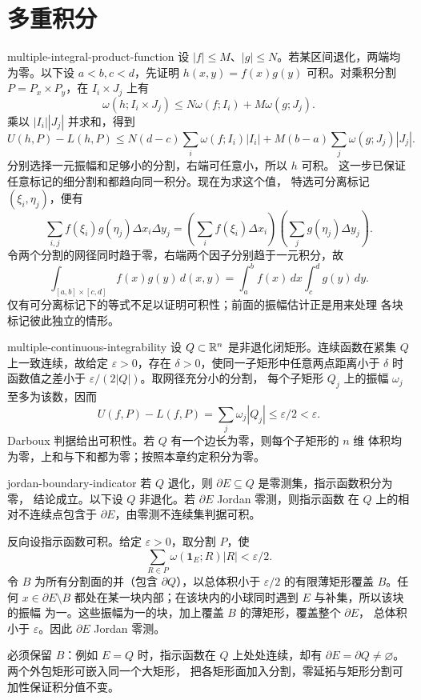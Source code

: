 \chapter{多重积分}
\label{chap:multiple-integrals-solutions}

\begin{solution}{multiple-integral-product-function}
设 $|f|\le M$、$|g|\le N$。若某区间退化，两端均为零。以下设
$a<b,c<d$，先证明 $h(x,y)=f(x)g(y)$ 可积。对乘积分割
$P=P_x\times P_y$，在 $I_i\times J_j$ 上有
\[
 \omega(h;I_i\times J_j)
 \le N\omega(f;I_i)+M\omega(g;J_j).
\]
乘以 $|I_i||J_j|$ 并求和，得到
\[
 U(h,P)-L(h,P)
 \le N(d-c)\sum_i\omega(f;I_i)|I_i|
     +M(b-a)\sum_j\omega(g;J_j)|J_j|.
\]
分别选择一元振幅和足够小的分割，右端可任意小，所以 $h$ 可积。
这一步已保证任意标记的细分割和都趋向同一积分。现在为求这个值，
特选可分离标记 $(\xi_i,\eta_j)$，便有
\[
 \sum_{i,j}f(\xi_i)g(\eta_j)\Delta x_i\Delta y_j
 =\left(\sum_i f(\xi_i)\Delta x_i\right)
  \left(\sum_j g(\eta_j)\Delta y_j\right).
\]
令两个分割的网径同时趋于零，右端两个因子分别趋于一元积分，故
\[
 \int_{[a,b]\times[c,d]}f(x)g(y)\,d(x,y)
 =\int_a^bf(x)\,dx\int_c^dg(y)\,dy.
\]
仅有可分离标记下的等式不足以证明可积性；前面的振幅估计正是用来处理
各块标记彼此独立的情形。
\end{solution}

\begin{solution}{multiple-continuous-integrability}
设 $Q\subset\mathbb{R}^n$ 是非退化闭矩形。连续函数在紧集 $Q$ 上一致连续，故给定
$\varepsilon>0$，存在 $\delta>0$，使同一子矩形中任意两点距离小于
$\delta$ 时函数值之差小于 $\varepsilon/(2|Q|)$。取网径充分小的分割，
每个子矩形 $Q_j$ 上的振幅 $\omega_j$ 至多为该数，因而
\[
 U(f,P)-L(f,P)=\sum_j\omega_j|Q_j|\le\varepsilon/2<\varepsilon.
\]
Darboux 判据给出可积性。若 $Q$ 有一个边长为零，则每个子矩形的 $n$ 维
体积均为零，上和与下和都为零；按照本章约定积分为零。
\end{solution}

\begin{solution}{jordan-boundary-indicator}
若 $Q$ 退化，则 $\partial E\subseteq Q$ 是零测集，指示函数积分为零，
结论成立。以下设 $Q$ 非退化。若 $\partial E$ Jordan 零测，则指示函数
在 $Q$ 上的相对不连续点包含于 $\partial E$，由零测不连续集判据可积。

反向设指示函数可积。给定 $\varepsilon>0$，取分割 $P$，使
\[
 \sum_{R\in P}\omega(\mathbf1_E;R)|R|<\varepsilon/2.
\]
令 $B$ 为所有分割面的并（包含 $\partial Q$），以总体积小于
$\varepsilon/2$ 的有限薄矩形覆盖 $B$。任何 $x\in\partial E\setminus B$
都处在某一块内部；在该块内的小球同时遇到 $E$ 与补集，所以该块的振幅
为一。这些振幅为一的块，加上覆盖 $B$ 的薄矩形，覆盖整个 $\partial E$，
总体积小于 $\varepsilon$。因此 $\partial E$ Jordan 零测。

必须保留 $B$：例如 $E=Q$ 时，指示函数在 $Q$ 上处处连续，却有
$\partial E=\partial Q\ne\varnothing$。两个外包矩形可嵌入同一个大矩形，
把各矩形面加入分割，零延拓与矩形分割可加性保证积分值不变。
\end{solution}

